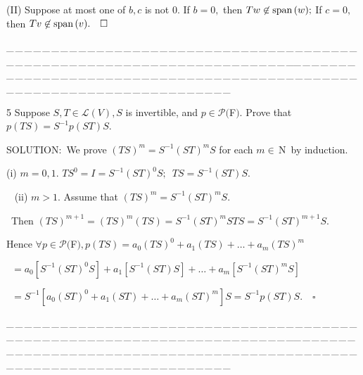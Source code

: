 \documentclass[a4paper, 11pt, UTF8]{article}
\def\Spn{\textup{span}\,}
\def\Lm{\mathcal{L}}
\def\Po{\mathcal{P}}
\def\Nbfc{$\,{\timesbf N}$}
\begin{document}
\begin{large}
(II) Suppose at most one of $b,c$ is not $0.$ If $b=0,$ then $Tw\not\in\Spn(w);$ If $c=0,$ then $Tv\not\in\Spn(v).\quad\square$\par
{\tiny \_\,\_\,\_\,\_\,\_\,\_\,\_\,\_\,\_\,\_\,\_\,\_\,\_\,\_\,\_\,\_\,\_\,\_\,\_\,\_\,\_\,\_\,\_\,\_\,\_\,\_\,\_\,\_\,\_\,\_\,\_\,\_\,\_\,\_\,\_\,\_\,\_\,\_\,\_\,\_\,\_\,\_\,\_\,\_\,\_\,\_\,\_\,\_\,\_\,\_\,\_\,\_\,\_\,\_\,\_\,\_\,\_\,\_\,\_\,\_\,\_\,\_\,\_\,\_\,\_\,\_\,\_\,\_\,\_\,\_\,\_\_\,\_\,\_\,\_\,\_\,\_\,\_\,\_\,\_\,\_\,\_\,\_\,\_\,\_\,\_\,\_\,\_\,\_\,\_\,\_\,\_\,\_\,\_\,\_\,\_\,\_\,\_\,\_\,\_\,\_\,\_\,\_\,\_\,\_\,\_\,\_\,\_\,\_\,\_\,\_\,\_\,\_\,\_\,\_\,\_\,\_\,\_\,\_\,\_\,\_\,\_\,\_\,\_\,\_\,\_\,\_\,\_\,\_\,\_\,\_\,\_\,\_\,\_\,\_\,\_\,\_\,\_\,\_\,\_\,\_\,\_}\par

{\timesbf\Large 5} {\timessl\Large 
Suppose $S,T\in\Lm(V),S$ is invertible, and $p\in\Po(${\timesbf F}$)$. Prove that $p(TS) = S^{-1} p(ST)S.$
}\par
{\timesbf S\footnotesize{OLUTION:}}\,\,\,We prove $(TS)^m=S^{-1}(ST)^m S$ for each $m\in\Nbfc\,$ by induction.\par\quad
(i) $m=0,1.$ $TS^{0}=I=S^{-1}(ST)^{0}S;\,\,\,TS=S^{-1}(ST)S.$\par\,\,\,
(ii) $m>1.$ Assume that $(TS)^{m}=S^{-1}(ST)^{m} S.$\par\qquad\qquad\quad\,
Then $(TS)^{m+1}=(TS)^{m}(TS)=S^{-1}(ST)^{m} STS=S^{-1}(ST)^{m+1} S.$\par\quad
Hence $\forall p\in\Po(${\timesbf F}$),p(TS)=a_0 (TS)^0+a_1 (TS)+\dots+a_m (TS)^m$\par\qquad\qquad\qquad\qquad\qquad\quad\,
$=a_0 [S^{-1}(ST)^0 S] +a_1 [S^{-1}(ST)S]+\dots+a_m [S^{-1}(ST)^{m} S]$\par\qquad\qquad\qquad\qquad\qquad\quad\,
$=S^{-1}[a_0 (ST)^0+a_1 (ST)+\dots+a_m (ST)^m]S=S^{-1}p(ST)S.\quad\square$\par
{\tiny \_\,\_\,\_\,\_\,\_\,\_\,\_\,\_\,\_\,\_\,\_\,\_\,\_\,\_\,\_\,\_\,\_\,\_\,\_\,\_\,\_\,\_\,\_\,\_\,\_\,\_\,\_\,\_\,\_\,\_\,\_\,\_\,\_\,\_\,\_\,\_\,\_\,\_\,\_\,\_\,\_\,\_\,\_\,\_\,\_\,\_\,\_\,\_\,\_\,\_\,\_\,\_\,\_\,\_\,\_\,\_\,\_\,\_\,\_\,\_\,\_\,\_\,\_\,\_\,\_\,\_\,\_\,\_\,\_\,\_\,\_\_\,\_\,\_\,\_\,\_\,\_\,\_\,\_\,\_\,\_\,\_\,\_\,\_\,\_\,\_\,\_\,\_\,\_\,\_\,\_\,\_\,\_\,\_\,\_\,\_\,\_\,\_\,\_\,\_\,\_\,\_\,\_\,\_\,\_\,\_\,\_\,\_\,\_\,\_\,\_\,\_\,\_\,\_\,\_\,\_\,\_\,\_\,\_\,\_\,\_\,\_\,\_\,\_\,\_\,\_\,\_\,\_\,\_\,\_\,\_\,\_\,\_\,\_\,\_\,\_\,\_\,\_\,\_\,\_\,\_\,\_\par}


\end{large}
\end{document}
